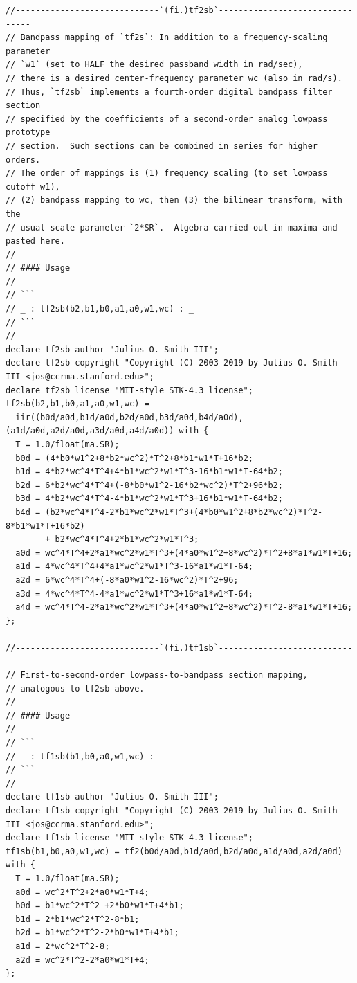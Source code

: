 \documentclass{article}
\begin{document}
\begin{lstlisting}[caption=\texttt{filters.lib}]
//-----------------------------`(fi.)tf2sb`--------------------------------
// Bandpass mapping of `tf2s`: In addition to a frequency-scaling parameter
// `w1` (set to HALF the desired passband width in rad/sec),
// there is a desired center-frequency parameter wc (also in rad/s).
// Thus, `tf2sb` implements a fourth-order digital bandpass filter section
// specified by the coefficients of a second-order analog lowpass prototype
// section.  Such sections can be combined in series for higher orders.
// The order of mappings is (1) frequency scaling (to set lowpass cutoff w1),
// (2) bandpass mapping to wc, then (3) the bilinear transform, with the
// usual scale parameter `2*SR`.  Algebra carried out in maxima and pasted here.
//
// #### Usage
//
// ```
// _ : tf2sb(b2,b1,b0,a1,a0,w1,wc) : _
// ```
//----------------------------------------------
declare tf2sb author "Julius O. Smith III";
declare tf2sb copyright "Copyright (C) 2003-2019 by Julius O. Smith III <jos@ccrma.stanford.edu>";
declare tf2sb license "MIT-style STK-4.3 license";
tf2sb(b2,b1,b0,a1,a0,w1,wc) =
  iir((b0d/a0d,b1d/a0d,b2d/a0d,b3d/a0d,b4d/a0d),(a1d/a0d,a2d/a0d,a3d/a0d,a4d/a0d)) with {
  T = 1.0/float(ma.SR);
  b0d = (4*b0*w1^2+8*b2*wc^2)*T^2+8*b1*w1*T+16*b2;
  b1d = 4*b2*wc^4*T^4+4*b1*wc^2*w1*T^3-16*b1*w1*T-64*b2;
  b2d = 6*b2*wc^4*T^4+(-8*b0*w1^2-16*b2*wc^2)*T^2+96*b2;
  b3d = 4*b2*wc^4*T^4-4*b1*wc^2*w1*T^3+16*b1*w1*T-64*b2;
  b4d = (b2*wc^4*T^4-2*b1*wc^2*w1*T^3+(4*b0*w1^2+8*b2*wc^2)*T^2-8*b1*w1*T+16*b2)
        + b2*wc^4*T^4+2*b1*wc^2*w1*T^3;
  a0d = wc^4*T^4+2*a1*wc^2*w1*T^3+(4*a0*w1^2+8*wc^2)*T^2+8*a1*w1*T+16;
  a1d = 4*wc^4*T^4+4*a1*wc^2*w1*T^3-16*a1*w1*T-64;
  a2d = 6*wc^4*T^4+(-8*a0*w1^2-16*wc^2)*T^2+96;
  a3d = 4*wc^4*T^4-4*a1*wc^2*w1*T^3+16*a1*w1*T-64;
  a4d = wc^4*T^4-2*a1*wc^2*w1*T^3+(4*a0*w1^2+8*wc^2)*T^2-8*a1*w1*T+16;
};

//-----------------------------`(fi.)tf1sb`--------------------------------
// First-to-second-order lowpass-to-bandpass section mapping,
// analogous to tf2sb above.
//
// #### Usage
//
// ```
// _ : tf1sb(b1,b0,a0,w1,wc) : _
// ```
//----------------------------------------------
declare tf1sb author "Julius O. Smith III";
declare tf1sb copyright "Copyright (C) 2003-2019 by Julius O. Smith III <jos@ccrma.stanford.edu>";
declare tf1sb license "MIT-style STK-4.3 license";
tf1sb(b1,b0,a0,w1,wc) = tf2(b0d/a0d,b1d/a0d,b2d/a0d,a1d/a0d,a2d/a0d) with {
  T = 1.0/float(ma.SR);
  a0d = wc^2*T^2+2*a0*w1*T+4;
  b0d = b1*wc^2*T^2 +2*b0*w1*T+4*b1;
  b1d = 2*b1*wc^2*T^2-8*b1;
  b2d = b1*wc^2*T^2-2*b0*w1*T+4*b1;
  a1d = 2*wc^2*T^2-8;
  a2d = wc^2*T^2-2*a0*w1*T+4;
};


\end{lstlisting}
\end{document}
